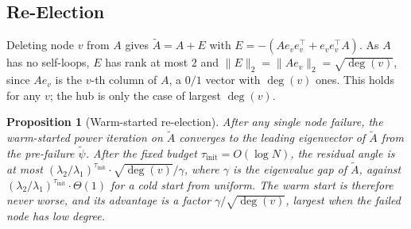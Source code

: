 \documentclass[letterpaper]{article} %
\newtheorem{proposition}{Proposition}
\begin{document}
\subsection{Re-Election}

Deleting node $v$ from $A$ gives $\tilde A = A + E$ with
$E = -(A e_v e_v^\top + e_v e_v^\top A)$. As $A$ has no self-loops, $E$ has rank
at most $2$ and $\|E\|_2 = \|A e_v\|_2 = \sqrt{\deg(v)}$, since $A e_v$ is the
$v$-th column of $A$, a $0/1$ vector with $\deg(v)$ ones. This holds for any $v$;
the hub is only the case of largest $\deg(v)$.

\begin{proposition}[Warm-started re-election]
\label{prop:reelection}
After any single node failure, the warm-started power iteration on $\tilde A$ converges to the leading eigenvector of $\tilde A$ from the pre-failure $\tilde\psi$. After the fixed budget $\tau_{\mathrm{init}} = O(\log N)$, the residual angle is at most $(\lambda_2/\lambda_1)^{\tau_{\mathrm{init}}}\cdot\sqrt{\deg(v)}/\gamma$, where $\gamma$ is the eigenvalue gap of $\tilde A$, against $(\lambda_2/\lambda_1)^{\tau_{\mathrm{init}}}\cdot\Theta(1)$ for a cold start from uniform. The warm start is therefore never worse, and its advantage is a factor $\gamma/\sqrt{\deg(v)}$, largest when the failed node has low degree.
\end{proposition}
\end{document}
